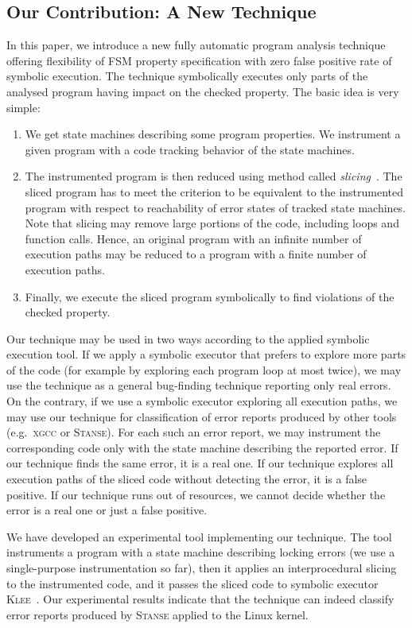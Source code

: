 \documentclass[10pt]{llncs}
\begin{document}
\subsection{Our Contribution: A New Technique}
In this paper, we introduce a new fully automatic program analysis
technique offering flexibility of FSM property specification with zero false
positive rate of symbolic execution. The technique symbolically executes
only parts of the analysed program having impact on the checked
property. The basic idea is very simple:
\begin{enumerate}
\item We get state machines describing some program properties. We
  instrument a given program with a code tracking behavior of the state
  machines.
\item The instrumented program is then reduced using method called
  \emph{slicing}~\cite{Wei84}. The sliced program has to meet the criterion
  to be equivalent to the instrumented program with respect to reachability
  of error states of tracked state machines. Note that slicing may remove
  large portions of the code, including loops and function calls. Hence, an
  original program with an infinite number of execution paths may be reduced
  to a program with a finite number of execution paths.
\item Finally, we execute the sliced program symbolically to find violations
  of the checked property.
\end{enumerate}
Our technique may be used in two ways according to the applied symbolic
execution tool. If we apply a symbolic executor that prefers to explore more
parts of the code (for example by exploring each program loop at most twice),
we may use the technique as a general bug-finding technique reporting only
real errors.  On the contrary, if we use a symbolic executor exploring all
execution paths, we may use our technique for classification of error reports
produced by other tools (e.g.~\textsc{xgcc} or \textsc{Stanse}). For each such
an error report, we may instrument the corresponding code only with the state
machine describing the reported error. If our technique finds the same error,
it is a real one.  If our technique explores all execution paths of the sliced
code without detecting the error, it is a false positive. If our technique
runs out of resources, we cannot decide whether the error is a real one or
just a false positive.

We have developed an experimental tool implementing our technique. The tool
instruments a program with a state machine describing locking errors (we use
a single-purpose instrumentation so far), then it applies an interprocedural
slicing to the instrumented code, and it passes the sliced code to symbolic
executor \textsc{Klee}~\cite{klee}. Our experimental results indicate that
the technique can indeed classify error reports produced by \textsc{Stanse}
applied to the Linux kernel.
\end{document}
